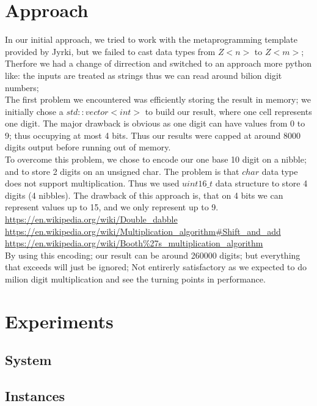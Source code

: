 \documentclass{DIKU-report}
\begin{document}
\section*{Approach}
In our initial approach, we tried to work with the metaprogramming template provided by Jyrki, but we failed to cast data types from $Z<n>$ to $Z<m>$;\\
Therfore we had a change of dirrection and switched to an approach more python like: the inputs are treated as strings thus we can read around bilion digit numbers;\\
The first problem we encountered was efficiently storing the result in memory; we initially chose a $std::vector<int>$ to build our result, where one cell represents one digit. The major drawback is obvious as one digit can have values from 0 to 9; thus occupying at most 4 bits. Thus our results were capped at around 8000 digits output before running out of memory.\\
To overcome this problem, we chose to encode our one base 10 digit on a nibble; and to store 2 digits on an unsigned char. The problem is that $char$ data type does not support multiplication. Thus we used $uint16\_t$ data structure to store 4 digits (4 nibbles). The drawback of this approach is, that on 4 bits we can represent values up to 15, and we only represent up to 9.\\
\url{https://en.wikipedia.org/wiki/Double_dabble}\\
\url{https://en.wikipedia.org/wiki/Multiplication_algorithm#Shift_and_add}\\
\url{https://en.wikipedia.org/wiki/Booth%27s_multiplication_algorithm}\\
By using this encoding; our result can be around 260000 digits; but everything that exceeds will just be ignored; Not entirerly satisfactory as we expected to do milion digit multiplication and see the turning points in performance.

\vspace*{\fill}
\newpage
\addvspace{\bigskipamount}
\section*{Experiments}
\subsection*{System}
\subsection*{Instances}
\end{document}
